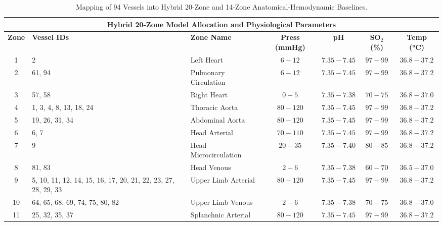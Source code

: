 \documentclass[sigconf]{acmart}
\begin{document}
\begin{table}[htbp]
    \centering
    \scriptsize 
    \renewcommand{\arraystretch}{0.9} 
    \setlength{\tabcolsep}{3pt}
    \caption{Mapping of 94 Vessels into Hybrid 20-Zone and 14-Zone Anatomical-Hemodynamic Baselines.}
    \label{tab:combined_zone_mappings}
    
    \begin{tabular}{@{} c p{5.3cm} | l c c c c @{}}
    \toprule
    \multicolumn{7}{c}{\textbf{Hybrid 20-Zone Model Allocation and Physiological Parameters}} \\
    \midrule
    \textbf{Zone} & \textbf{Vessel IDs} & \textbf{Zone Name} & \textbf{Press (mmHg)} & \textbf{pH} & \textbf{SO$_2$ (\%)} & \textbf{Temp (\si{\degreeCelsius})} \\
    \midrule
    1  & 2 & Left Heart & $6{-}12$ & $7.35{-}7.45$ & $97{-}99$ & $36.8{-}37.2$ \\ 
    2  & 61, 94 & Pulmonary Circulation & $6{-}12$ & $7.35{-}7.45$ & $97{-}99$ & $36.8{-}37.2$ \\ 
    3  & 57, 58 & Right Heart & $0{-}5$ & $7.35{-}7.38$ & $70{-}75$ & $36.8{-}37.0$ \\ 
    4  & 1, 3, 4, 8, 13, 18, 24 & Thoracic Aorta & $80{-}120$ & $7.35{-}7.45$ & $97{-}99$ & $36.8{-}37.2$ \\ 
    5  & 19, 26, 31, 34 & Abdominal Aorta & $80{-}120$ & $7.35{-}7.45$ & $97{-}99$ & $36.8{-}37.2$ \\ 
    6  & 6, 7 & Head Arterial & $70{-}110$ & $7.35{-}7.45$ & $97{-}99$ & $36.8{-}37.2$ \\ 
    7  & 9 & Head Microcirculation & $20{-}35$ & $7.35{-}7.40$ & $80{-}85$ & $36.8{-}37.2$ \\ 
    8  & 81, 83 & Head Venous & $2{-}6$ & $7.35{-}7.38$ & $60{-}70$ & $36.5{-}37.0$ \\ 
    9  & 5, 10, 11, 12, 14, 15, 16, 17, 20, 21, 22, 23, 27, 28, 29, 33 & Upper Limb Arterial & $80{-}120$ & $7.35{-}7.45$ & $97{-}99$ & $36.8{-}37.2$ \\ 
    10 & 64, 65, 68, 69, 74, 75, 80, 82 & Upper Limb Venous & $2{-}6$ & $7.35{-}7.38$ & $70{-}75$ & $36.8{-}37.0$ \\ 
    11 & 25, 32, 35, 37 & Splanchnic Arterial & $80{-}120$ & $7.35{-}7.45$ & $97{-}99$ & $36.8{-}37.2$ \\ 

\end{tabular}
\end{table}
\end{document}
